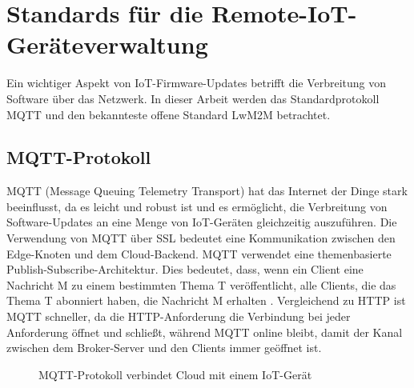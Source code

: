 
\chapter{Standards für die Remote-IoT-Geräteverwaltung}
\label{sec:ota}

Ein wichtiger Aspekt von IoT-Firmware-Updates betrifft die Verbreitung von Software über das Netzwerk. In dieser Arbeit werden das Standardprotokoll MQTT und den bekannteste offene Standard LwM2M betrachtet. 

\section{MQTT-Protokoll}
\label{sec:ota:mqtt}
MQTT (Message Queuing Telemetry Transport) hat das Internet der Dinge stark beeinflusst, da es leicht und robust ist und es ermöglicht, die Verbreitung von Software-Updates an eine Menge von IoT-Geräten gleichzeitig auszuführen. Die Verwendung von MQTT über SSL bedeutet eine Kommunikation zwischen den Edge-Knoten und dem Cloud-Backend. MQTT verwendet eine themenbasierte Publish-Subscribe-Architektur. Dies bedeutet, dass, wenn ein Client eine Nachricht M zu einem bestimmten Thema T veröffentlicht, alle Clients, die das Thema T abonniert haben, die Nachricht M erhalten \cite{website:mqttcoap}. Vergleichend zu HTTP ist MQTT schneller, da die HTTP-Anforderung die Verbindung bei jeder Anforderung öffnet und schließt, während MQTT online bleibt, damit der Kanal zwischen dem Broker-Server und den Clients immer geöffnet ist. 


\begin{figure}[h!]
	\centering
	\caption{MQTT-Protokoll verbindet Cloud mit einem IoT-Gerät}
	\label{fig:mqtt}
\end{figure}

